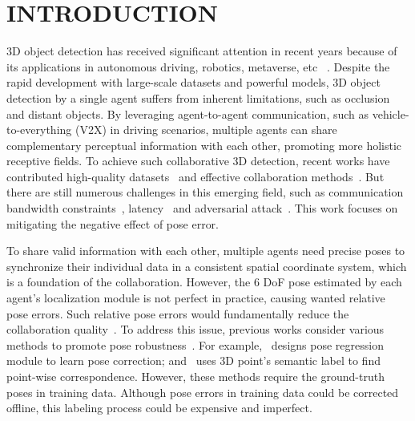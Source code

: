 \documentclass[letterpaper, 10 pt, conference]{ieeeconf}  %
\begin{document}
\section{INTRODUCTION}
3D object detection has received significant attention in recent years because of its applications in autonomous driving, robotics, metaverse, etc~\cite{lang2019pointpillars,chen20203d,10044977} . Despite the rapid development with large-scale datasets and powerful models, 3D object detection by a single agent suffers from inherent limitations, such as occlusion and distant
objects. By leveraging agent-to-agent communication, such as vehicle-to-everything (V2X) in driving scenarios, multiple agents can share complementary perceptual information with each other, promoting more holistic receptive fields. To achieve such collaborative 3D detection, recent works have contributed high-quality datasets~\cite{Li_2021_RAL, xu2022opv2v, yu2022dairv2x, arnold2021data} and effective collaboration methods~\cite{chen2019f,DBLP:conf/eccv/WangMLYZU20,Li_2021_NeurIPS, arnold2020cooperative}. But there are still numerous challenges in this emerging field, such as communication bandwidth constraints~\cite{DBLP:conf/eccv/WangMLYZU20,Where2comm:22}, latency~\cite{lei2022latency} and adversarial attack~\cite{tu2021adversarial}.  This work focuses on mitigating the negative effect of pose error.


To share valid information with each other, multiple agents need precise poses to synchronize their individual data in a consistent spatial coordinate system, which is a foundation of the collaboration. However, the 6 DoF pose estimated by each agent's localization module is not perfect in practice, causing wanted relative pose errors. Such relative pose errors would fundamentally reduce the collaboration quality~\cite{DBLP:conf/eccv/WangMLYZU20}. To address this issue, previous works consider various methods to promote pose robustness~\cite{glaser2021overcoming, xu2022v2xvit,pmlr-v155-vadivelu21a,9682601}. For example,~\cite{pmlr-v155-vadivelu21a}  designs pose regression module to learn pose correction; and~\cite{9682601} uses 3D point's semantic label to find point-wise correspondence. However, these methods require the ground-truth poses in training data. Although pose errors in training data could be corrected offline, this labeling process could be expensive and imperfect.
\end{document}
